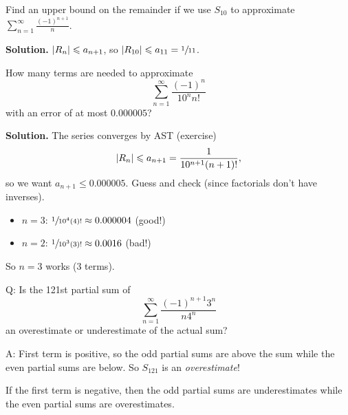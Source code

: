 \begin{Example}{}{}
    Find an upper bound on the remainder if we use $ S_{10} $ to approximate
    $ \sum\limits_{n=1}^{\infty} \frac{(-1)^{n+1}}{n} $.

    \textbf{Solution.} $ \lvert R_n\rvert\leqslant a_{n+1} $, so $ \lvert R_{10}\rvert\leqslant a_{11}=\sfrac{1}{11} $.
\end{Example}

\begin{Example}{}{}
    How many terms are needed to approximate
    \[ \sum\limits_{n=1}^{\infty} \frac{(-1)^n}{10^n n!} \]
    with an error of at most $ 0.000005 $?

    \textbf{Solution.} The series converges by AST (exercise)
    \[ \lvert R_n\rvert\leqslant a_{n+1}=\frac{1}{10^{n+1}(n+1)!}, \]
    so we want $ a_{n+1}\leqslant 0.000005 $. Guess and check
    (since factorials don't have inverses).
    \begin{itemize}
        \item $ n=3 $: $ \sfrac{1}{10^4(4)!}\approx 0.000004 $ (good!)
        \item $ n=2 $: $ \sfrac{1}{10^3(3)!} \approx 0.0016 $ (bad!)
    \end{itemize}
    So $ n=3 $ works (3 terms).
\end{Example}

Q\@: Is the 121st partial sum of
\[ \sum\limits_{n=1}^{\infty} \frac{(-1)^{n+1}3^n}{n 4^n}  \]
an overestimate or underestimate of the actual sum?

A\@: First term is positive, so the odd partial sums are
above the sum while the even partial sums are below. So
$ S_{121} $ is an \emph{overestimate}!

\begin{Remark}{}{}
    If the first term is negative, then the odd partial sums are underestimates
    while the even partial sums are overestimates.
\end{Remark}
